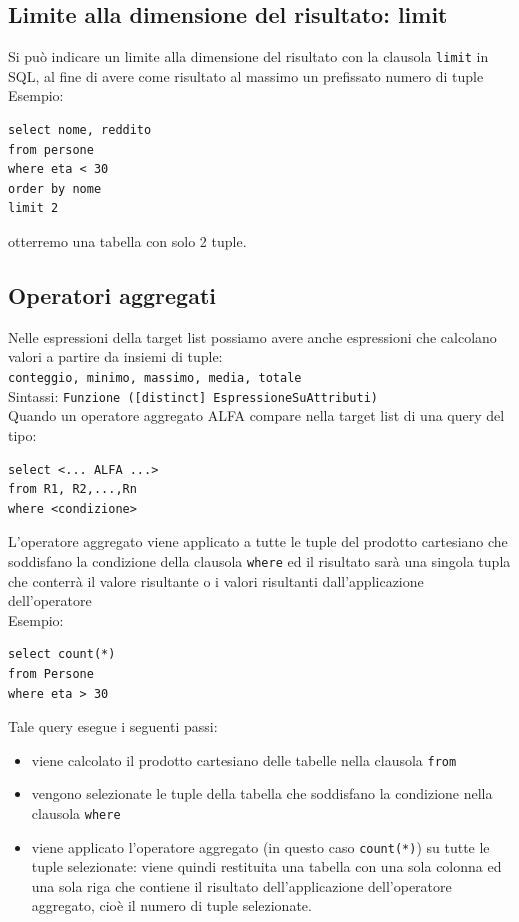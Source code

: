 \subsection{Limite alla dimensione del risultato: limit}
Si può indicare un limite alla dimensione del risultato con la clausola \texttt{limit} in SQL, al fine di avere come risultato al massimo un prefissato numero di tuple\\
\textcolor{verdeEsempio}{Esempio:}
\begin{verbatim}
select nome, reddito
from persone
where eta < 30
order by nome
limit 2
\end{verbatim}
\noindent otterremo una tabella con solo 2 tuple.

\subsection{Operatori aggregati}
Nelle espressioni della target list possiamo avere anche espressioni che calcolano valori a partire da insiemi di tuple:\\
\texttt{conteggio, minimo, massimo, media, totale}\\
Sintassi: \texttt{Funzione ([distinct] EspressioneSuAttributi)}\medskip\\
Quando un operatore aggregato ALFA compare nella target list di una query del tipo:
\begin{verbatim}
select <... ALFA ...>
from R1, R2,...,Rn
where <condizione>
\end{verbatim}
\noindent L'operatore aggregato viene applicato a tutte le tuple del prodotto cartesiano che soddisfano la condizione della clausola \texttt{where} ed il risultato sarà una 
singola tupla che conterrà il valore risultante o i valori risultanti dall'applicazione dell'operatore\\
\textcolor{verdeEsempio}{Esempio:}
\begin{verbatim}
select count(*)
from Persone
where eta > 30
\end{verbatim}
\noindent Tale query esegue i seguenti passi:\\
\begin{itemize}
    \item viene calcolato il prodotto cartesiano delle tabelle nella clausola \texttt{from}
    \item vengono selezionate le tuple della tabella che soddisfano la condizione nella clausola \texttt{where}
    \item viene applicato l'operatore aggregato (in questo caso \texttt{count(*)}) su tutte le tuple selezionate: viene quindi restituita 
            una tabella con una sola colonna ed una sola riga che contiene il risultato dell'applicazione dell'operatore aggregato, cioè il numero di tuple selezionate.
\end{itemize}
